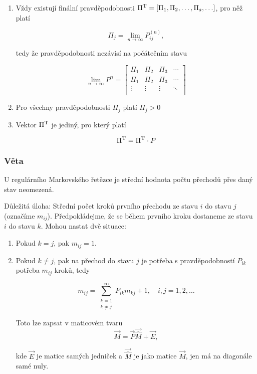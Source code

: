 \begin{enumerate}
\item Vždy existují finální pravděpodobnosti $\Pi^{\mathrm{T}}=[\Pi_1,\Pi_2,\ldots,\Pi_s,\ldots]$, pro něž platí

\[ \Pi_j=\lim_{n\to\infty}P_{ij}^{(n)}, \]

tedy že pravděpodobnosti nezávisí na počátečním stavu

\[ \lim_{n\to\infty}P^n = 
\begin{bmatrix}
\Pi_1 & \Pi_2 & \Pi_3 & \cdots \\
\Pi_1 & \Pi_2 & \Pi_3 & \cdots \\
\vdots & \vdots & \vdots & \ddots \\
\end{bmatrix} 
\]

\item Pro všechny pravděpodobnosti $\Pi_j$ platí $\Pi_j>0$

\item Vektor $\Pi^{\mathrm{T}}$ je jediný, pro který platí

\[ \Pi^{\mathrm{T}}=\Pi^{\mathrm{T}}\cdot P \]
\end{enumerate}

\subsubsection{Věta}
U regulárního Markovského řetězce je střední hodnota počtu přechodů přes daný stav neomezená.\br

Důležitá úloha: Střední počet kroků prvního přechodu ze stavu $i$ do stavu $j$ (označíme $m_{ij}$). Předpokládejme, že se během prvního kroku dostaneme ze stavu $i$ do stavu $k$. Mohou nastat dvě situace:

\begin{enumerate}
\item Pokud $k=j$, pak $m_{ij}=1$.
\item Pokud $k\neq j$, pak na přechod do stavu $j$ je potřeba s pravděpodobností $P_{ik}$ potřeba $m_{ij}$ kroků, tedy

\[ m_{ij}=\sum_{\substack{k=1\\k\neq j}}^\infty P_{ik}m_{kj}+1,\quad i,j=1,2,\ldots \]

Toto lze zapsat v maticovém tvaru
\[ \vec{M} = \vec{P}\vec{\widehat{M}} + \vec{E}, \]

kde $\vec{E}$ je matice samých jedniček a $\vec{\widehat{M}}$ je jako matice $\vec{M}$, jen má na diagonále samé nuly.
\end{enumerate}

